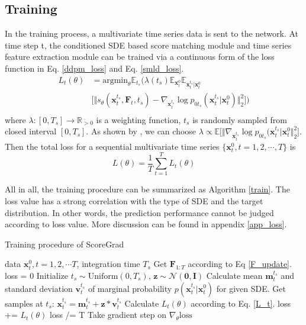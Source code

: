\subsection{Training} 
In the training process, a multivariate time series data is sent to the network. At time step t, the conditioned SDE based score matching module and time series feature extraction module can be trained via a continuous form of the loss function in Eq. \ref{ddpm_loss} and Eq. \ref{smld_loss}.
\begin{equation}\label{L_t}
	\begin{aligned}
		L_t(\theta) &= \text{argmin}_{\theta}\mathbb{E}_{t_s} \big(\lambda(t_s)\mathbb{E}_{\textbf{x}_{t}^0} \mathbb{E}_{\textbf{x}_t^{t_s}|\textbf{x}_t^0} \\
		&\big[\Vert s_{\theta}(\textbf{x}_t^{t_s}, \textbf{F}_t, t_s) -\nabla_{\textbf{x}_t^{t_s}}\log p_{0t_s}(\textbf{x}_t^{t_s}|\textbf{x}_t^0)\Vert_2^2 \big]\big)\\
	\end{aligned}
\end{equation}
where $\lambda: [0, T_s]\rightarrow \mathbb{R}_{>0}$ is a weighting function, $t_s$ is randomly sampled from closed interval $[0, T_s]$. As shown by \cite{song2020score}, we can choose $\lambda \propto\mathbb{E}\big[\Vert\nabla_{\textbf{x}_t^{t_s}}\log p_{0t_s}(\textbf{x}_t^{t_s}|\textbf{x}_t^0\Vert_2^2\big]$. Then the total loss for a sequential multivariate time series $\{\textbf{x}_t^{0}, t=1,2,\cdots, T\}$ is 
\begin{equation}
	L(\theta) = \frac{1}{T}\sum^T_{t=1}L_t(\theta)
\end{equation}

All in all, the training procedure can be summarized as Algorithm \ref{train}. The loss value has a strong correlation with the type of SDE and the target distribution. In other words, the prediction performance cannot be judged according to loss value. More discussion can be found in appendix \ref{app_loss}.
\begin{algorithm}
	\caption{Training procedure of ScoreGrad}
	\label{train}
	\begin{algorithmic}
		\Require data $\textbf{x}_t^0, t=1,2,\cdots T$, integration time $T_s$
		\State Get $\textbf{F}_{1:T}$ according to Eq \ref{F_update}.
		\Repeat
		\State loss = 0
		\State Initialize $t_s\sim \text{Uniform}(0, T_s)$, $\textbf{z}\sim\mathcal{N}(\textbf{0},\textbf{I})$
		\State Calculate mean $\textbf{m}_t^{t_s}$ and standard deviation $\textbf{v}_t^{t_s}$ of marginal probability $p(\textbf{x}_t^{t_s}|\textbf{x}_t^0)$ for given SDE.
		\State Get samples at $t_s$: $\textbf{x}_t^{t_s} = \textbf{m}_t^{t_s} + \textbf{z}*\textbf{v}_t^{t_s}$ 
		\State Calculate $L_t(\theta)$ according to Eq. \ref{L_t}.
		\State loss += $L_t(\theta)$
		\EndFor
		\State	loss /= T
		\State Take gradient step on $\nabla_{\theta}\text{loss}$
	\end{algorithmic}
\end{algorithm}

